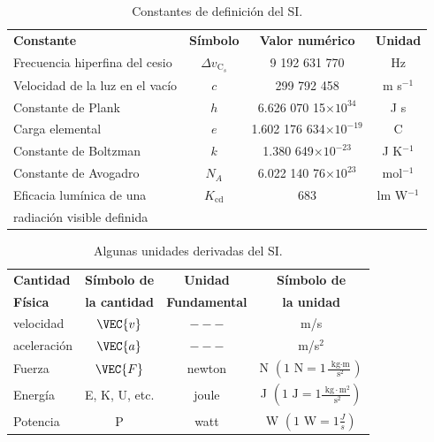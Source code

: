 \begin{table}[h!]
\caption{Constantes de definici\'on del SI.}
\label{tab:SI-const}
\begin{center}
\begin{tabular}{lccc}
\toprule
\textbf{Constante}&\textbf{S\'imbolo}&\textbf{Valor num\'erico}&\textbf{Unidad}\\[.5cm]
\otoprule 
Frecuencia hiperfina del cesio & $\Delta v_{\text{C}}_s$& 9 192 631 770& Hz\\[.5cm]
Velocidad de la luz en el vac\'io & $c$& 299 792 458& m s$^{-1}$\\[.5cm]
Constante de Plank & $h$& 6.626 070 15$\times 10^{34}$& J s\\[.5cm]
Carga elemental& $e$& 1.602 176 634$\times 10^{-19}$& C\\[.5cm]
Constante de Boltzman& $k$& 1.380 649$\times 10^{-23}$& J K$^{-1}$\\[.5cm]
Constante de Avogadro& $N_A$& 6.022 140 76$\times 10^{23}$& mol$^{-1}$\\[.5cm]
Eficacia lum\'inica de una  & $K_{\text{cd}}$&683&lm W$^{-1}$\\[.5cm]
\hspace{3ex}radiaci\'on visible definida & & & \\[.5cm]
\bottomrule
\end{tabular}
\end{center}
\end{table}



\begin{table}[h!]
\caption{Algunas unidades derivadas del SI.}
\label{tab:SI-der}
\begin{center}
\begin{tabular}{lccc}
\toprule
\textbf{Cantidad}&\textbf{S\'imbolo de}&\textbf{Unidad}&\textbf{S\'imbolo de}\\[.5cm]
\textbf{F\'isica}&\textbf{la cantidad}&\textbf{Fundamental}&\textbf{la unidad}\\[.5cm]
\otoprule 
velocidad & $\VEC{v}$& $---$ & m/s\\[.5cm]
aceleraci\'on & $\VEC{a}$& $---$ & m/s$^{2}$\\[.5cm]
Fuerza & $\VEC{F}$& newton & N $\left(1 \text{ N}=1\frac{\text{ kg}\cdot \mbox{m}}{\text{ s}^{2}}\right)$\\[.5cm]
Energ\'ia & E, K, U, etc. & joule & J $\left(1 \text{ J}=1\frac{\text{ kg}\cdot \mbox{m}^{2}}{\text{ s}^{2}}\right)$\\[.5cm]
Potencia & P & watt & W $\left(1 \text{ W}=1\frac{J}{s}\right)$\\[.5cm]
\bottomrule
\end{tabular}
\end{center}
\end{table}


